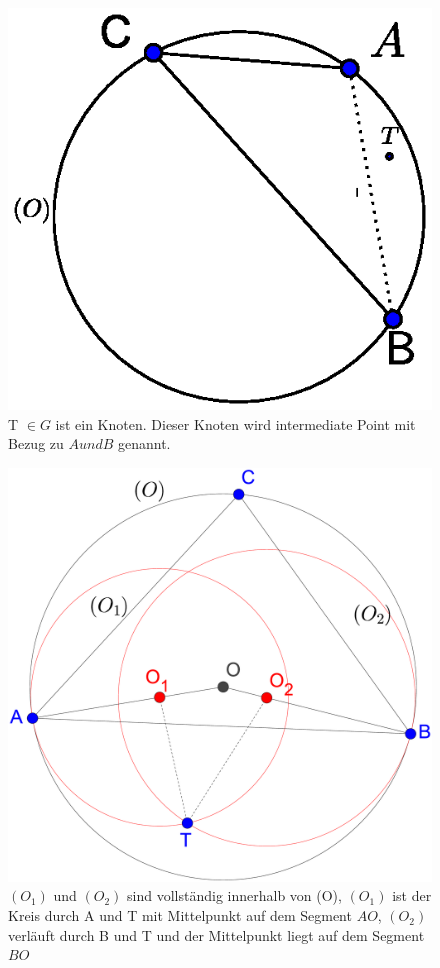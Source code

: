 \documentclass[a4paper,twoside]{IEEEtran}
\begin{document}
\begin{figure}[h!]
\centering
\includegraphics[width=1\linewidth]{outward_path1.eps}
\caption{T $\in G $ ist ein Knoten. Dieser Knoten wird intermediate Point mit Bezug zu $A und B $ genannt.}
\label{fig:intermediate}
\end{figure}

\begin{figure}[h!]
\centering
\includegraphics[width=0.8\linewidth]{outward_path_kreise.eps}
\caption{ $(O_1) $ und $(O_2) $ sind vollständig innerhalb von (O), $(O_1) $ ist der Kreis durch A und T mit Mittelpunkt auf dem Segment $AO $, $(O_2) $ verläuft durch B und T und der Mittelpunkt liegt auf dem Segment $BO $} 
\label{fig:outward_path_kreise}
\end{figure}
\end{document}
